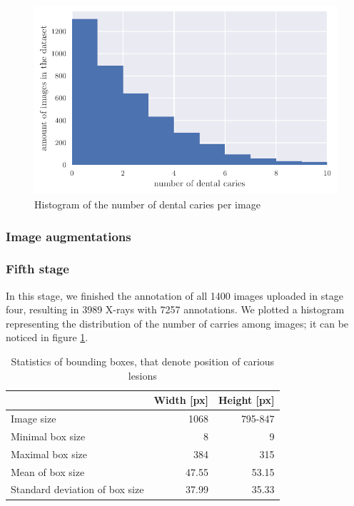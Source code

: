 \begin{figure}
    \includegraphics[width=0.9\linewidth]{images/caries_histogram.pdf}
    \caption{Histogram of the number of dental caries per image}
    \label{fig:hist_caries_per_img}
\end{figure}
\subsubsection{Image augmentations}

\subsubsection{Fifth stage}
\label{sec:dataset:fifth_stage}
In this stage, we finished the annotation of all 1400 images uploaded in stage four, resulting in 3989 X-rays with 7257 annotations. We plotted a histogram representing the distribution of the number of carries among images; it can be noticed in figure \ref{fig:hist_caries_per_img}.


\begin{table}
    \centering
    \begin{tabular}{|l|r|r|}
        \hline
                                       & Width [px] & Height [px] \\\hline
        Image size                     & 1068       & 795-847     \\ \hline
        Minimal box size               & 8          & 9           \\ \hline
        Maximal box size               & 384        & 315         \\ \hline
        Mean of box size               & 47.55      & 53.15       \\ \hline
        Standard deviation of box size & 37.99      & 35.33       \\ \hline
    \end{tabular}
    \caption{\label{tab:dataset_statistics}Statistics of bounding boxes, that denote position of carious lesions}
\end{table}

